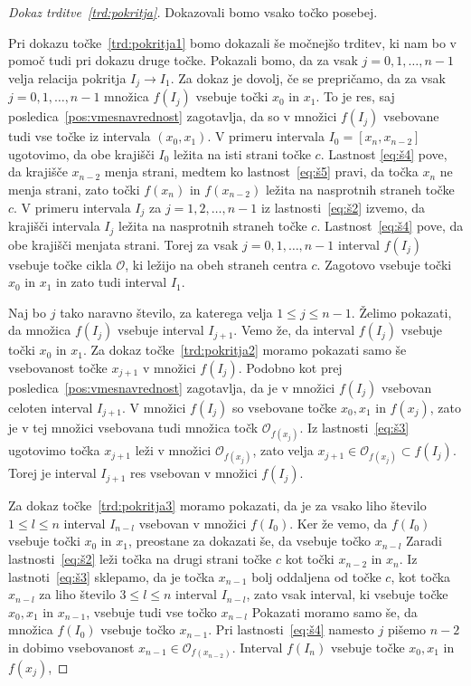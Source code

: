 \documentclass[mat2]{fmfdelo}
\begin{document}
\begin{proof}[Dokaz trditve~\ref{trd:pokritja}]
Dokazovali bomo vsako točko posebej. 

Pri dokazu točke~\ref{trd:pokritja1} bomo dokazali še močnejšo trditev, ki nam bo v pomoč tudi pri dokazu druge točke. Pokazali bomo, da za vsak $j = 0, 1, \dots, n-1$ velja relacija pokritja $I_j \to I_1$.  Za dokaz je dovolj, če se prepričamo, da za vsak $j=0, 1, \dots, n-1$ množica $f(I_j)$ vsebuje točki $x_0$ in $x_1$. To je res, saj posledica~\ref{pos:vmesnavrednost} zagotavlja, da so v množici $f(I_j)$ vsebovane tudi vse točke iz intervala $(x_0, x_1)$. V primeru intervala $I_0 = [x_n, x_{n-2}]$ ugotovimo, da obe krajišči $I_0$ ležita na isti strani točke $c$. Lastnost \ref{eq:š4} pove, da krajišče $x_{n-2}$ menja strani, medtem ko lastnost~\ref{eq:š5} pravi, da točka $x_n$ ne menja strani, zato točki $f(x_n)$ in $f(x_{n-2})$ ležita na nasprotnih straneh točke $c$. V primeru intervala $I_j$ za $j = 1, 2, \dots, n-1$ iz lastnosti~\ref{eq:š2} izvemo, da krajišči intervala $I_j$ ležita na nasprotnih straneh točke $c$. Lastnost~\ref{eq:š4} pove, da obe krajišči menjata strani. Torej za vsak $j=0, 1, \dots, n-1$ interval $f(I_j)$ vsebuje točke cikla $\mathcal{O}$, ki ležijo na obeh straneh centra $c$. Zagotovo vsebuje točki $x_0$ in $x_1$ in zato tudi interval $I_1$.

Naj bo $j$ tako naravno število, za katerega velja $1 \leq j \leq n-1$. Želimo pokazati, da množica $f(I_j)$ vsebuje interval $I_{j+1}$. Vemo že, da interval $f(I_j)$ vsebuje točki $x_0$ in $x_1$. Za dokaz točke~\ref{trd:pokritja2} moramo pokazati samo še vsebovanost točke $x_{j+1}$ v množici $f(I_j)$. Podobno kot prej posledica~\ref{pos:vmesnavrednost} zagotavlja, da je v množici $f(I_j)$ vsebovan celoten interval $I_{j+1}$. V množici $f(I_j)$ so vsebovane točke $x_0, x_1$ in $f(x_j)$, zato je v tej množici vsebovana tudi množica točk $\mathcal{O}_{f(x_j)}$. Iz lastnosti~\ref{eq:š3} ugotovimo točka $x_{j+1}$ leži v množici $\mathcal{O}_{f(x_j)}$, zato velja $x_{j+1} \in \mathcal{O}_{f(x_j)} \subset f(I_j)$. Torej je interval $I_{j+1}$ res vsebovan v množici $f(I_j)$.

Za dokaz točke~\ref{trd:pokritja3} moramo pokazati, da je za vsako liho število $1 \leq l \leq n$ interval $I_{n-l}$ vsebovan v množici $f(I_0)$.  
Ker že vemo, da $f(I_0)$ vsebuje točki $x_0$ in $x_1$, preostane za dokazati še, da vsebuje točko $x_{n-l}$ Zaradi lastnosti~\ref{eq:š2} leži točka na drugi strani točke $c$ kot točki $x_{n-2}$ in $x_n$. Iz lastnoti~\ref{eq:š3} sklepamo, da je točka $x_{n-1}$ bolj oddaljena od točke $c$, kot točka $x_{n-l}$ za liho število $3 \leq l \leq n$ interval $I_{n-l}$, zato vsak interval, ki vsebuje točke $x_0, x_1$ in $x_{n-1}$, vsebuje tudi vse točko $x_{n-l}$ Pokazati moramo samo še, da množica $f(I_0)$ vsebuje točko $x_{n-1}$. Pri lastnosti~\ref{eq:š4} namesto $j$ pišemo $n-2$ in dobimo vsebovanost $x_{n-1} \in \mathcal{O}_{f(x_{n-2})}$. Interval $f(I_n)$ vsebuje točke $x_0, x_1$ in $f(x_j)$, 
\end{proof}
\end{document}
